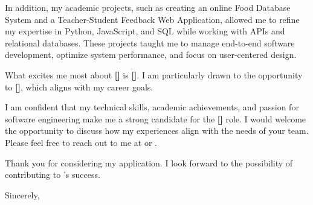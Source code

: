 \documentclass[10pt]{article}
\begin{document}
In addition, my academic projects, such as creating an online Food Database System and a Teacher-Student Feedback Web Application, allowed me to refine my expertise in Python, JavaScript, and SQL while working with APIs and relational databases. These projects taught me to manage end-to-end software development, optimize system performance, and focus on user-centered design.

What excites me most about \textbf{[\company]} is \textbf{[\companyDetails]}. I am particularly drawn to the opportunity to \textbf{[\positionDetails]}, which aligns with my career goals.

I am confident that my technical skills, academic achievements, and passion for software engineering make me a strong candidate for the \textbf{[\position]} role. I would welcome the opportunity to discuss how my experiences align with the needs of your team. Please feel free to reach out to me at \href{tel:+15149445977}{\phone} or \href{mailto:\email}{\email}.

\vspace{1.5em}
Thank you for considering my application. I look forward to the possibility of contributing to \company's success.

\vspace{2em}
Sincerely, \\
\fullname
\end{document}
